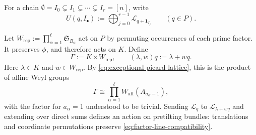 \documentclass[a4paper,reqno]{amsart}
\theoremstyle{definition}
\begin{document}
For a chain $\emptyset=I_0\subsetneq I_1\subsetneq\cdots\subsetneq I_r=[n]$, write
\begin{equation}\label{eq:pretilting-flag-expression}
U(q,I_\bullet):=
\bigoplus_{j=0}^{r-1}\mathcal L_{q+\mathbf1_{I_j}}
\qquad(q\in P).
\end{equation}

Let $W_{\mathrm{rep}}:=\prod_{\alpha=1}^\ell\mathfrak S_{B_\alpha}$ act on $P$ by permuting occurrences of each prime factor. It preserves $\phi$, and therefore acts on $K$. Define
\begin{equation}\label{eq:repeated-affine-weyl-group}
\Gamma:=K\rtimes W_{\mathrm{rep}},\qquad
(\lambda,w)q:=\lambda+wq.
\end{equation}
Here $\lambda\in K$ and $w\in W_{\mathrm{rep}}$. By \eqref{eq:exceptional-picard-lattice}, this is the product of affine Weyl groups
\[
\Gamma\cong\prod_{\alpha=1}^\ell
W_{\mathrm{aff}}(A_{a_\alpha-1}),
\]
with the factor for $a_\alpha=1$ understood to be trivial. Sending $\mathcal L_q$ to $\mathcal L_{\lambda+wq}$ and extending over direct sums defines an action on pretilting bundles: translations and coordinate permutations preserve \eqref{eq:factor-line-compatibility}.
\end{document}

